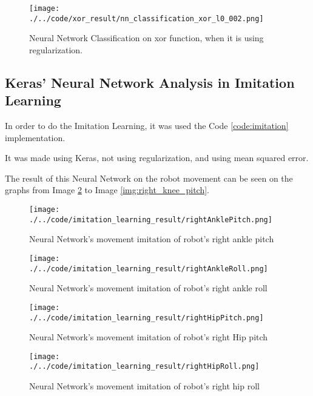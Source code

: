 \documentclass[journal]{IEEEtran}
\begin{document}
\begin{figure}
    \begin{center}
    \texttt{[image: ./../code/xor\_result/nn\_classification\_xor\_l0\_002.png]}
    \caption{Neural Network Classification on xor function, when it is using regularization.}
    \label{img:xor_classification_reg}
    \end{center}
\end{figure}

\subsection{Keras' Neural Network Analysis in Imitation Learning}

In order to do the Imitation Learning, it was used the Code \ref{code:imitation} implementation.

It was made using Keras, not using regularization, and using mean squared error.

The result of this Neural Network on the robot movement can be seen on the graphs from Image \ref{img:right_ankle_pitch} to Image \ref{img:right_knee_pitch}.

\begin{figure}
  \begin{center}
  \texttt{[image: ./../code/imitation\_learning\_result/rightAnklePitch.png]}
  \caption{Neural Network's movement imitation of robot's right ankle pitch}
  \label{img:right_ankle_pitch}
  \end{center}
\end{figure}

\begin{figure}
  \begin{center}
  \texttt{[image: ./../code/imitation\_learning\_result/rightAnkleRoll.png]}
  \caption{Neural Network's movement imitation of robot's right ankle roll}
  \label{img:right_ankle_roll}
  \end{center}
\end{figure}

\begin{figure}
  \begin{center}
  \texttt{[image: ./../code/imitation\_learning\_result/rightHipPitch.png]}
  \caption{Neural Network's movement imitation of robot's right Hip pitch}
  \label{img:right_hip_pitch}
  \end{center}
\end{figure}

\begin{figure}
  \begin{center}
  \texttt{[image: ./../code/imitation\_learning\_result/rightHipRoll.png]}
  \caption{Neural Network's movement imitation of robot's right hip roll}
  \label{img:right_hip_roll}
  \end{center}
\end{figure}
\end{document}
